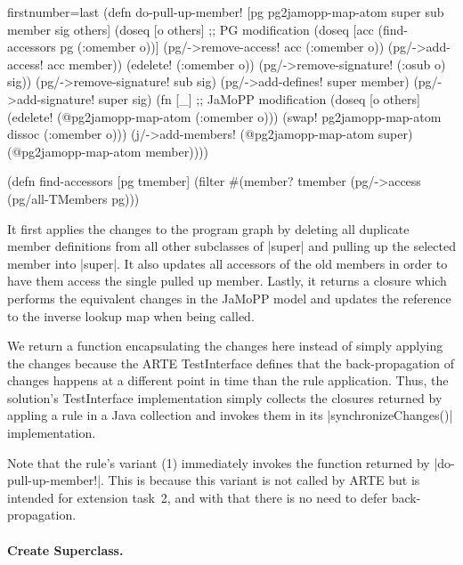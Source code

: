 \documentclass[submission]{eptcs}
\newcommand{\code}{\clojureinline}
\begin{document}
\begin{clojurecode*}{firstnumber=last}
(defn do-pull-up-member! [pg pg2jamopp-map-atom super sub member sig others]
  (doseq [o others]                                                 ;; PG modification
    (doseq [acc (find-accessors pg (:omember o))]
      (pg/->remove-access! acc (:omember o))
      (pg/->add-access! acc member))
    (edelete! (:omember o))
    (pg/->remove-signature! (:osub o) sig))
  (pg/->remove-signature! sub sig)
  (pg/->add-defines! super member)
  (pg/->add-signature! super sig)
  (fn [_]                                                           ;; JaMoPP modification
    (doseq [o others]
      (edelete! (@pg2jamopp-map-atom (:omember o)))
      (swap! pg2jamopp-map-atom dissoc (:omember o)))
    (j/->add-members! (@pg2jamopp-map-atom super) (@pg2jamopp-map-atom member))))

(defn find-accessors [pg tmember]
  (filter #(member? tmember (pg/->access %
          (pg/all-TMembers pg)))
\end{clojurecode*}

It first applies the changes to the program graph by deleting all duplicate
member definitions from all other subclasses of \code|super| and pulling up the
selected member into \code|super|.  It also updates all accessors of the old
members in order to have them access the single pulled up member.  Lastly, it
returns a closure which performs the equivalent changes in the JaMoPP model and
updates the reference to the inverse lookup map when being called.

We return a function encapsulating the changes here instead of simply applying
the changes because the ARTE \textsf{TestInterface} defines that the
back-propagation of changes happens at a different point in time than the rule
application.  Thus, the solution's \textsf{TestInterface} implementation simply
collects the closures returned by appling a rule in a Java collection and
invokes them in its \code|synchronizeChanges()| implementation.

Note that the rule's variant (1) immediately invokes the function returned by
\code|do-pull-up-member!|.  This is because this variant is not called by ARTE
but is intended for extension task~2, and with that there is no need to defer
back-propagation.



\paragraph{Create Superclass.}
\end{document}
